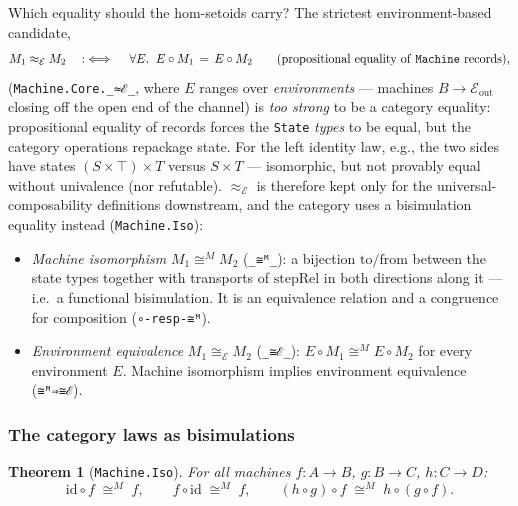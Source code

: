 \documentclass[11pt]{article}
\newtheorem{theorem}{Theorem}
\newcommand{\id}{\mathrm{id}}
\newcommand{\stepRel}{\mathrm{stepRel}}
\begin{document}
Which equality should the hom-setoids carry?  The strictest
environment-based candidate,
\[
  M_1 \approx_\mathcal{E} M_2
  \quad:\iff\quad
  \forall E.\;\; E \circ M_1 \,=\, E \circ M_2
  \qquad (\text{propositional equality of \texttt{Machine} records}),
\]
(\texttt{Machine.Core.\_≈ℰ\_}, where $E$ ranges over
\emph{environments} --- machines $B \to \mathcal{E}_{\mathrm{out}}$
closing off the open end of the channel) is \emph{too strong} to be a
category equality: propositional equality of records forces the
\texttt{State} \emph{types} to be equal, but the category operations
repackage state.  For the left identity law, e.g., the two sides have
states $(S \times \top) \times T$ versus $S \times T$ --- isomorphic,
but not provably equal without univalence (nor refutable).
$\approx_\mathcal{E}$ is therefore kept only for the
universal-composability definitions downstream, and the category uses
a bisimulation equality instead (\texttt{Machine.Iso}):

\begin{itemize}
  \item \emph{Machine isomorphism} $M_1 \cong^{M} M_2$
        (\texttt{\_≅ᴹ\_}): a bijection
        $\mathrm{to}/\mathrm{from}$ between the state types together
        with transports of $\stepRel$ in both directions along it ---
        i.e.\ a functional bisimulation.  It is an equivalence
        relation and a congruence for composition
        (\texttt{∘-resp-≅ᴹ}).
  \item \emph{Environment equivalence} $M_1 \cong_\mathcal{E} M_2$
        (\texttt{\_≅ℰ\_}): $E \circ M_1 \cong^{M} E \circ M_2$ for
        every environment $E$.  Machine isomorphism implies
        environment equivalence (\texttt{≅ᴹ⇒≅ℰ}).
\end{itemize}

\subsubsection{The category laws as bisimulations}

\begin{theorem}[\texttt{Machine.Iso}]\label{thm:bisim}
For all machines $f : A \to B$, $g : B \to C$, $h : C \to D$:
\[
  \id \circ f \;\cong^{M}\; f, \qquad
  f \circ \id \;\cong^{M}\; f, \qquad
  (h \circ g) \circ f \;\cong^{M}\; h \circ (g \circ f).
\]
\end{theorem}
\end{document}
